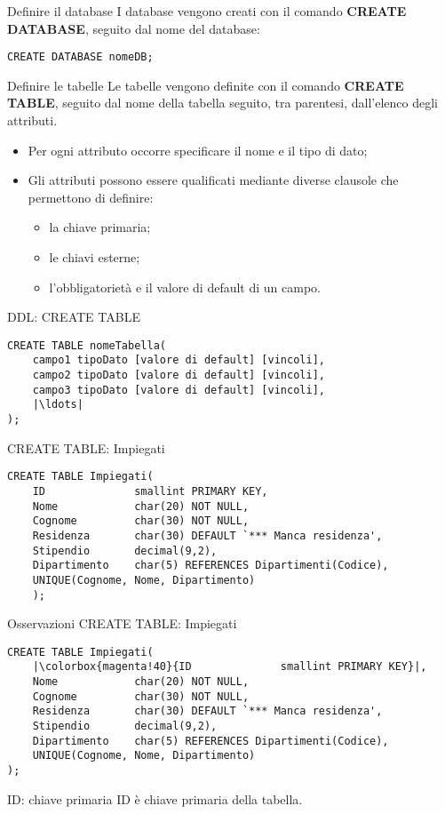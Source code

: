 \begin{frame}[fragile]{Definire il database}
I database vengono creati con il comando \textbf{CREATE DATABASE}, seguito dal nome del database:
\begin{lstlisting}
CREATE DATABASE nomeDB;
\end{lstlisting}
\end{frame}
%
\begin{frame}{Definire le tabelle}
Le tabelle vengono definite con il comando \textbf{CREATE TABLE}, seguito dal nome della tabella seguito, tra parentesi, dall'elenco degli attributi.
\begin{itemize}
    \item Per ogni attributo occorre specificare il nome e il tipo di dato;
    \item Gli attributi possono essere qualificati mediante diverse clausole che permettono di definire:
    \begin{itemize}
        \item la chiave primaria;
        \item le chiavi esterne;
        \item l'obbligatoriet\`a e il valore di default di un campo.
    \end{itemize}
\end{itemize}
\end{frame}
%
\begin{frame}[fragile]{DDL: CREATE TABLE}
\begin{lstlisting}
CREATE TABLE nomeTabella(
    campo1 tipoDato [valore di default] [vincoli],
    campo2 tipoDato [valore di default] [vincoli],
    campo3 tipoDato [valore di default] [vincoli],
    |\ldots|
);
\end{lstlisting}
\end{frame}
%
\begin{frame}[fragile]{CREATE TABLE: Impiegati}
\begin{lstlisting}
CREATE TABLE Impiegati(
    ID              smallint PRIMARY KEY,
    Nome            char(20) NOT NULL,
    Cognome         char(30) NOT NULL,
    Residenza       char(30) DEFAULT `*** Manca residenza',
    Stipendio       decimal(9,2),
    Dipartimento    char(5) REFERENCES Dipartimenti(Codice),
    UNIQUE(Cognome, Nome, Dipartimento)
    );
\end{lstlisting}
\end{frame}
%
\begin{frame}[fragile]{Osservazioni CREATE TABLE: Impiegati}
\begin{lstlisting}
CREATE TABLE Impiegati(
    |\colorbox{magenta!40}{ID              smallint PRIMARY KEY}|,
    Nome            char(20) NOT NULL,
    Cognome         char(30) NOT NULL,
    Residenza       char(30) DEFAULT `*** Manca residenza',
    Stipendio       decimal(9,2),
    Dipartimento    char(5) REFERENCES Dipartimenti(Codice),
    UNIQUE(Cognome, Nome, Dipartimento)
);
\end{lstlisting}
\begin{minipage}{0.4\textwidth}
    \begin{block}{ID: chiave primaria}
        ID \`e chiave primaria della tabella.
    \end{block}
    \end{minipage}
\end{frame}
